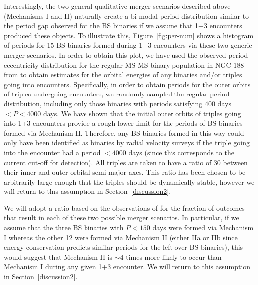 \begin{enumerate}
Interestingly, the two general qualitative merger scenarios described above 
(Mechanisms I and II) naturally create a bi-modal period distribution
similar to the period gap observed for the BS binaries if we assume
that 1+3 encounters produced these objects.  To illustrate this, 
Figure~\ref{fig:per-num} shows a histogram of periods for 15 BS
binaries formed during 1+3 encounters via these two generic merger
scenarios.  In order to obtain this plot, we have 
used the observed period-eccentricity distribution for the regular
MS-MS binary population in NGC 188 from \citet{geller09} to obtain
estimates for the orbital energies of any binaries and/or triples
going into encounters.  Specifically, in order to obtain periods for
the outer orbits of triples undergoing encounters, we randomly sampled 
the regular period distribution, including only those 
binaries with periods satisfying $400$ days $< P < 4000$ days.  We
have shown that the initial outer orbits of triples going into 1+3
encounters provide a rough lower limit for the periods of BS binaries
formed via Mechanism II.  Therefore, any BS binaries formed in this
way could only have been identified as binaries by radial velocity
surveys if the triple going into the encounter had a period $< 4000$
days (since this corresponds to the current cut-off for detection).
All triples are taken to have a 
ratio of 30 between their inner and outer orbital semi-major axes.
This ratio has been chosen to be arbitrarily large enough that the
triples should be dynamically stable, however we will return to this
assumption in Section~\ref{discussion2}.  

We will adopt a ratio based on the observations of
\citet{mathieu09} for the fraction of outcomes that result in each of
these two possible merger scenarios.  In particular, if we assume that
the three BS 
binaries with $P < 150$ days were formed via Mechanism I whereas the
other 12 were formed via Mechanism II (either IIa or IIb since energy
conservation predicts similar periods for the left-over BS binaries),
this would suggest that Mechanism II is $\sim 4$ times more likely to
occur than Mechanism I during any given 1+3 encounter.  We will return
to this assumption in Section~\ref{discussion2}.


\end{enumerate}
